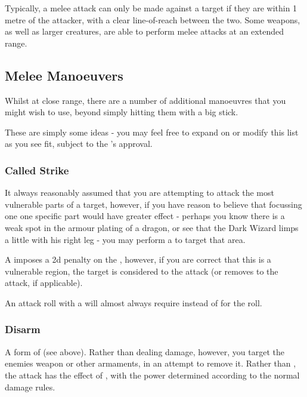 Typically, a melee attack can only be made against a target if they are within 1 metre of the attacker, with a clear line-of-reach between the two. Some weapons, as well as larger creatures, are able to perform melee attacks at an extended range. 




\subsection{Melee Manoeuvers}


Whilst at close range, there are a number of additional manoeuvres that you might wish to use, beyond simply hitting them with a big stick.

These are simply some ideas - you may feel free to expand on or modify this list as you see fit, subject to the 's approval.

\subsubsection{Called Strike}

It always reasonably assumed that you are attempting to attack the most vulnerable parts of a target, however, if you have reason to believe that focussing one one specific part would have greater effect - perhaps you know there is a weak spot in the armour plating of a dragon, or see that the Dark Wizard limps a little with his right leg - you may perform a  to target that area.

A  imposes a 2d penalty on the , however, if you are correct that this is a vulnerable region, the target is considered  to the attack (or removes  to the attack, if applicable).

An attack roll with a  will almost always require  instead of  for the roll. 

\subsubsection{Disarm}

A form of  (see above). Rather than dealing damage, however, you target the enemies weapon or other armaments, in an attempt to remove it. Rather than , the attack has the effect of , with the power determined according to the normal damage rules. 

